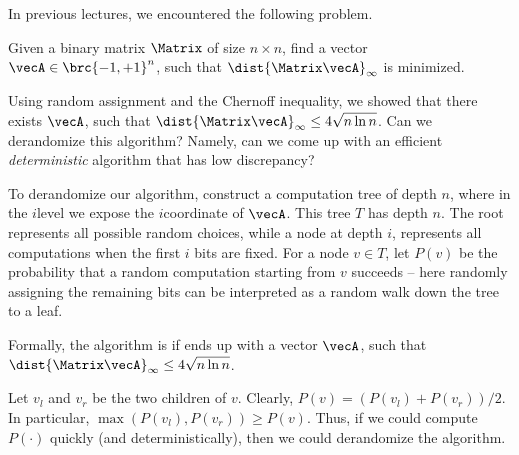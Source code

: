 In previous lectures, we encountered the following problem.

\begin{problem}
    Given a binary matrix $\Matrix$ of size $n \times n$, find a
    vector $\vecA \in \brc{-1,+1}^n$, such that
    $\dist{\Matrix \vecA}_\infty$ is minimized.
\end{problem}

Using random assignment and the Chernoff inequality, we showed that
there exists $\vecA$, such that
$\dist{\Matrix \vecA}_\infty \leq 4 \sqrt{ n\ln n}$. Can we
derandomize this algorithm?  Namely, can we come up with an efficient
\emph{deterministic} algorithm that has low discrepancy?

To derandomize our algorithm, construct a computation tree of depth
$n$, where in the $i$\th level we expose the $i$\th coordinate of
$\vecA$.  This tree $T$ has depth $n$. The root represents all
possible random choices, while a node at depth $i$, represents all
computations when the first $i$ bits are fixed. For a node $v \in T$,
let $P(v)$ be the probability that a random computation starting from
$v$ succeeds -- here randomly assigning the remaining bits can be
interpreted as a random walk down the tree to a leaf.

Formally, the algorithm is  if ends up with a vector
$\vecA$, such that
$\dist{\Matrix \vecA}_\infty \leq 4 \sqrt{ n\ln n}$.

Let $v_l$ and $v_r$ be the two children of $v$.
Clearly, $P(v) = (P(v_l) + P(v_r))/2$. In particular, $\max( P(v_l),
P(v_r)) \geq P(v)$. Thus, if we could compute $P(\cdot)$ quickly (and
deterministically), then we could derandomize the algorithm.


